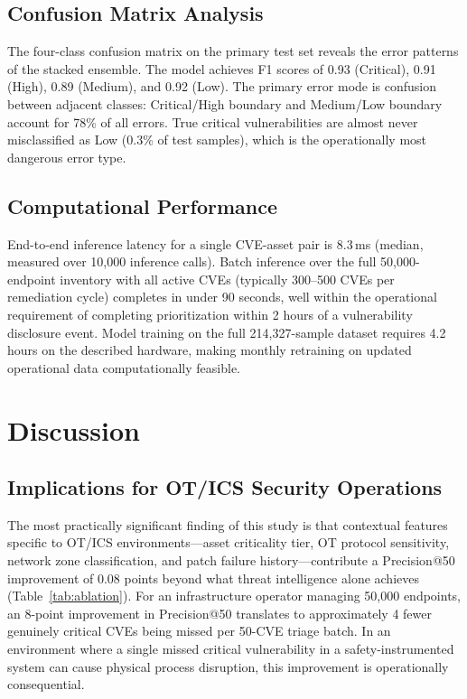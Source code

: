 \documentclass[review,12pt]{elsarticle}
\begin{document}
\subsection{Confusion Matrix Analysis}

The four-class confusion matrix on the primary test set reveals the error patterns of the stacked ensemble. The model achieves F1 scores of 0.93 (Critical), 0.91 (High), 0.89 (Medium), and 0.92 (Low). The primary error mode is confusion between adjacent classes: Critical/High boundary and Medium/Low boundary account for 78\% of all errors. True critical vulnerabilities are almost never misclassified as Low (0.3\% of test samples), which is the operationally most dangerous error type.

\subsection{Computational Performance}

End-to-end inference latency for a single CVE-asset pair is 8.3\,ms (median, measured over 10,000 inference calls). Batch inference over the full 50,000-endpoint inventory with all active CVEs (typically 300--500 CVEs per remediation cycle) completes in under 90 seconds, well within the operational requirement of completing prioritization within 2 hours of a vulnerability disclosure event. Model training on the full 214,327-sample dataset requires 4.2 hours on the described hardware, making monthly retraining on updated operational data computationally feasible.

\section{Discussion}
\label{sec:discussion}

\subsection{Implications for OT/ICS Security Operations}

The most practically significant finding of this study is that contextual features specific to OT/ICS environments---asset criticality tier, OT protocol sensitivity, network zone classification, and patch failure history---contribute a Precision@50 improvement of 0.08 points beyond what threat intelligence alone achieves (Table~\ref{tab:ablation}). For an infrastructure operator managing 50,000 endpoints, an 8-point improvement in Precision@50 translates to approximately 4 fewer genuinely critical CVEs being missed per 50-CVE triage batch. In an environment where a single missed critical vulnerability in a safety-instrumented system can cause physical process disruption, this improvement is operationally consequential.
\end{document}
